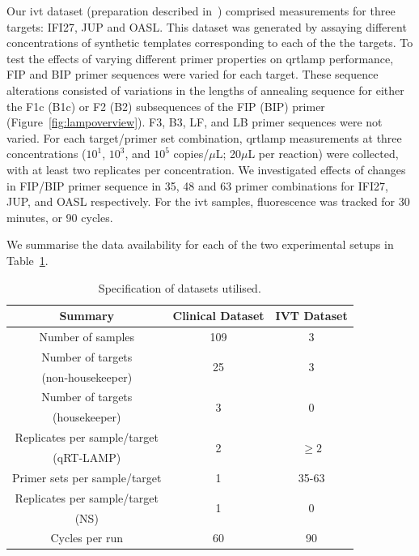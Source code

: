 \documentclass[../thesis.tex]{subfiles}
\begin{document}
Our \gls{ivt}  dataset (preparation described in~\citet{remmel_diagnostic_2022}) comprised measurements for three targets: {IFI27}, {JUP} and {OASL}. This dataset was generated by assaying different concentrations of synthetic  templates corresponding to each of the the targets. To test the effects of varying different primer properties on \gls{qrtlamp} performance, FIP and BIP primer sequences were varied for each target. These sequence alterations consisted of variations in the lengths of annealing sequence for either the F1c (B1c) or F2 (B2) subsequences of the FIP (BIP) primer (Figure~\ref{fig:lampoverview}). F3, B3, LF, and LB primer sequences were not varied. For each target/primer set combination, \gls{qrtlamp} measurements at three  concentrations ($10^1$, $10^3$, and $10^5$ copies/$\mu$L; 20$\mu$L per reaction) were collected, with at least two replicates per concentration. We investigated effects of changes in FIP/BIP primer sequence in 35, 48 and 63 primer combinations for {IFI27}, {JUP}, and {OASL} respectively. For the \gls{ivt} samples, fluorescence was tracked for 30 minutes, or 90 cycles. 

We summarise the data availability for each of the two experimental setups in Table~\ref{tab:datasets}. 
\begin{table}[!t] 
\centering
{\begin{tabular}{ccc}
\hline \textbf{Summary} & \textbf{Clinical Dataset} &
\textbf{IVT Dataset}  \\\hline
Number of samples & 109 & 3  \\
Number of targets  & \multirow{2}{*}{25} & \multirow{2}{*}{3} \\
(non-housekeeper) & & \\
Number of targets & \multirow{2}{*}{3} & \multirow{2}{*}{0} \\
(housekeeper) & & \\
Replicates per sample/target & \multirow{2}{*}{2} & \multirow{2}{*}{$\geq 2$} \\
(qRT-LAMP) & & \\
Primer sets per sample/target & 1 & 35-63 \\
Replicates per sample/target & \multirow{2}{*}{1} & \multirow{2}{*}{0} \\
(NS) & & \\
Cycles per run & 60 & 90 \\
\hline
\end{tabular}}
\caption{Specification of datasets utilised.\label{tab:datasets}} 
\end{table}
\end{document}
